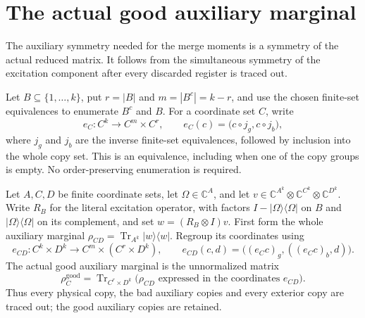 \section{The actual good auxiliary marginal}
\label{sec:replica_good_auxiliary_marginal}

The auxiliary symmetry needed for the merge moments is a symmetry of the
actual reduced matrix. It follows from the simultaneous symmetry of the
excitation component after every discarded register is traced out.

\begin{definition}
\label{def:good_bad_copies_equiv}
\leanok
Let $B\subseteq\{1,\ldots,k\}$, put $r=|B|$ and $m=|B^c|=k-r$, and use
the chosen finite-set equivalences to enumerate $B^c$ and $B$. For a
coordinate set $C$, write
\[
 e_C:C^k\longrightarrow C^m\times C^r,
 \qquad e_C(c)=\bigl(c\circ j_g,c\circ j_b\bigr),
\]
where $j_g$ and $j_b$ are the inverse finite-set equivalences, followed by
inclusion into the whole copy set. This is an equivalence, including when
one of the copy groups is empty. No order-preserving enumeration is required.
\end{definition}

\begin{definition}
\label{def:replica_good_auxiliary_marginal}
\leanok
Let $A,C,D$ be finite coordinate sets, let $\Omega\in\mathbb C^A$, and
let $v\in\mathbb C^{A^k}\otimes\mathbb C^{C^k}\otimes\mathbb C^{D^k}$.
Write $R_B$ for the literal excitation operator, with factors
$I-|\Omega\rangle\langle\Omega|$ on $B$ and
$|\Omega\rangle\langle\Omega|$ on its complement, and set
$w=(R_B\otimes I)v$. First form the whole auxiliary marginal
$\rho_{CD}=\operatorname{Tr}_{A^k}|w\rangle\langle w|$.
Regroup its coordinates using
\[
 e_{CD}:C^k\times D^k\longrightarrow C^m\times(C^r\times D^k),
 \qquad e_{CD}(c,d)=\bigl((e_Cc)_g,((e_Cc)_b,d)\bigr).
\]
The actual good auxiliary marginal is the unnormalized matrix
\[
 \rho_C^{\mathrm{good}}
   =\operatorname{Tr}_{C^r\times D^k}
      \bigl(\rho_{CD}\text{ expressed in the coordinates }e_{CD}\bigr).
\]
Thus every physical copy, the bad auxiliary copies and every exterior copy
are traced out; the good auxiliary copies are retained.
\end{definition}


